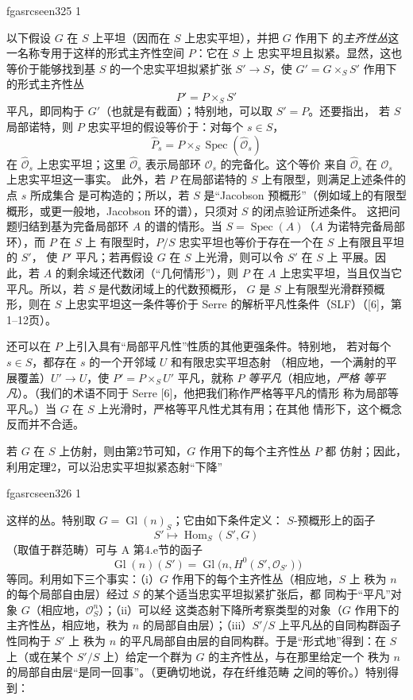 \documentclass[12pt,twoside,openany]{book}
\numberwithin{equation}{section}
\newcommand{\fgaunitid}{unbound}
\newcommand{\src}[1]{%
  \phantomsection
  \hypertarget{src:\fgaunitid:#1}{}%
  \hypertarget{fga.\fgaunitid.p#1}{}%
  \ifcsname fgasrcseen#1\endcsname\else
    \expandafter\gdef\csname fgasrcseen#1\endcsname{1}%
    \hypertarget{src:#1}{}%
  \fi
  \marginpar{\raggedleft\footnotesize\sffamily #1}%
}
\newcommand{\fquote}[1]{“#1”}
\theoremstyle{plain}
\theoremstyle{definition}
\theoremstyle{remark}
\begin{document}
\src{325}
以下假设 $G$ 在 $S$ 上平坦（因而在 $S$ 上忠实平坦），并把 $G$ 作用下
的\emph{主齐性丛}这一名称专用于这样的形式主齐性空间 $P$：它在 $S$ 上
忠实平坦且拟紧。显然，这也等价于能够找到基 $S$ 的一个忠实平坦拟紧扩张
$S'\longrightarrow S$，使 $G'=G\times_SS'$ 作用下的形式主齐性丛
\[
  P'=P\times_SS'
\]
平凡，即同构于 $G'$（也就是有截面）；特别地，可以取 $S'=P$。还要指出，
若 $S$ 局部诺特，则 $P$ 忠实平坦的假设等价于：对每个 $s\in S$，
\[
  \widehat P_s=P\times_S\operatorname{Spec}(\widehat{\mathcal O}_s)
\]
在 $\widehat{\mathcal O}_s$ 上忠实平坦；这里
$\widehat{\mathcal O}_s$ 表示局部环 $\mathcal O_s$ 的完备化。这个等价
来自 $\widehat{\mathcal O}_s$ 在 $\mathcal O_s$ 上忠实平坦这一事实。
此外，若 $P$ 在局部诺特的 $S$ 上有限型，则满足上述条件的点 $s$ 所成集合
是可构造的；所以，若 $S$ 是\fquote{Jacobson 预概形}（例如域上的有限型
概形，或更一般地，Jacobson 环的谱），只须对 $S$ 的闭点验证所述条件。
这把问题归结到基为完备局部环 $A$ 的谱的情形。当
$S=\operatorname{Spec}(A)$（$A$ 为诺特完备局部环），而 $P$ 在 $S$ 上
有限型时，$P/S$ 忠实平坦也等价于存在一个在 $S$ 上有限且平坦的 $S'$，
使 $P'$ 平凡；若再假设 $G$ 在 $S$ 上光滑，则可以令 $S'$ 在 $S$ 上
平展。因此，若 $A$ 的剩余域还代数闭（\fquote{几何情形}），则 $P$ 在
$A$ 上忠实平坦，当且仅当它平凡。所以，若 $S$ 是代数闭域上的代数预概形，
$G$ 是 $S$ 上有限型光滑群预概形，则在 $S$ 上忠实平坦这一条件等价于
Serre 的解析平凡性条件（SLF）（[6]，第1--12页）。

还可以在 $P$ 上引入具有\fquote{局部平凡性}性质的其他更强条件。特别地，
若对每个 $s\in S$，都存在 $s$ 的一个开邻域 $U$ 和有限忠实平坦态射
（相应地，一个满射的平展覆盖）$U'\longrightarrow U$，使
$P'=P\times_SU'$ 平凡，就称 $P$ \emph{等平凡}（相应地，\emph{严格
等平凡}）。（我们的术语不同于 Serre [6]，他把我们称作严格等平凡的情形
称为局部等平凡。）当 $G$ 在 $S$ 上光滑时，严格等平凡性尤其有用；在其他
情形下，这个概念反而并不合适。

若 $G$ 在 $S$ 上仿射，则由第2节可知，$G$ 作用下的每个主齐性丛 $P$ 都
仿射；因此，利用定理2，可以沿忠实平坦拟紧态射\fquote{下降}

\src{326}
这样的丛。特别取 $G=\operatorname{Gl}(n)_S$；它由如下条件定义：
$S$-预概形上的函子
\[
  S'\longmapsto\operatorname{Hom}_S(S',G)
\]
（取值于群范畴）可与 A 第4.e节的函子
\[
  \operatorname{Gl}(n)(S')
  =\operatorname{Gl}\bigl(n,H^0(S',\mathcal O_{S'})\bigr)
\]
等同。利用如下三个事实：（i）$G$ 作用下的每个主齐性丛（相应地，$S$ 上
秩为 $n$ 的每个局部自由层）经过 $S$ 的某个适当忠实平坦拟紧扩张后，都
同构于\fquote{平凡}对象 $G$（相应地，$\mathcal O_S^n$）；（ii）可以经
这类态射下降所考察类型的对象（$G$ 作用下的主齐性丛，相应地，秩为 $n$
的局部自由层）；（iii）$S'/S$ 上平凡丛的自同构群函子性同构于 $S'$ 上
秩为 $n$ 的平凡局部自由层的自同构群。于是\fquote{形式地}得到：在 $S$
上（或在某个 $S'/S$ 上）给定一个群为 $G$ 的主齐性丛，与在那里给定一个
秩为 $n$ 的局部自由层\fquote{是同一回事}。（更确切地说，存在纤维范畴
之间的等价。）特别得到：
\end{document}
